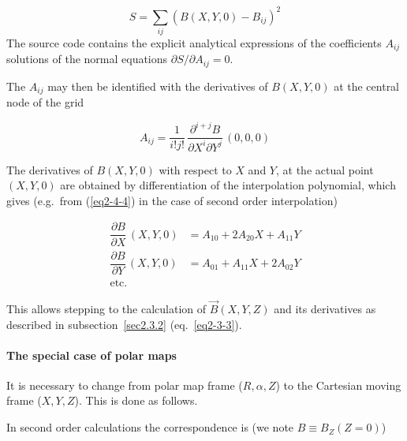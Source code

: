 \begin{equation}
	S = \sum_{ij}(B(X,Y,0)-B_{ij})^2 
	\label{eq2-4-5b} %
\end{equation}
%
The source code contains the explicit analytical 
expressions of the coefficients $A_{ij}$ solutions of the normal 
equations $\partial S / \partial A_{ij} = 0$.

\noindent The $ A_{ij} $ may then be identified with  the derivatives of 
$B(X,Y,0) $ at the central node of the grid 

\begin{equation}
	A_{ij} = \dfrac{1 }{ i!j!}\, \dfrac{\partial^{ i+j}B }{ \partial X^i\partial Y^j} \,(0,0,0) 
	\label{eq2-4-6}
\end{equation}

\noindent The derivatives of $ B(X,Y,0) $ with respect to $ X $ and $ Y$, at
the actual point 
$ (X,Y,0) $ are obtained by differentiation of the interpolation polynomial, 
which gives (e.g.~from (\ref{eq2-4-4}) in the case of second order interpolation)

\begin{equation}
	\begin{aligned}
		\dfrac{ \partial B }{ \partial X} \,(X,Y,0)  
		   & =   A_{10}+2A_{20}X+A_{11}Y \\
		 \dfrac{\partial B }{ \partial Y}\, (X,Y,0) 
		   & =  A_{01}+A_{11}X+2A_{02}Y \\
		\text{etc.} 
	\end{aligned}
	\label{eq2-4-7}
\end{equation}


\noindent This allows stepping to the calculation of $ \vec  B(X,Y,Z) $ and its derivatives
as described in subsection~\ref{sec2.3.2} (eq.~\ref{eq2-3-3}).

\paragraph{The special case of polar maps} 
 
 \noindent It is necessary to change from polar map frame ($R,\alpha,Z$) to the Cartesian 
moving frame ($X,Y,Z$).  This
is done as  follows. 

\noindent In second order calculations the correspondence is (we note $B \equiv B_Z(Z=0)$)


